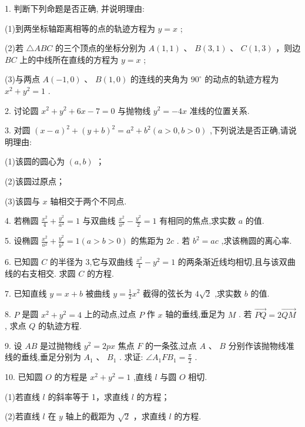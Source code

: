 \documentclass[10pt]{article}
\begin{document}
1. 判断下列命题是否正确, 并说明理由:

(1)到两坐标轴距离相等的点的轨迹方程为 \(y = x\) ;

(2)若 \(\bigtriangleup  {ABC}\) 的三个顶点的坐标分别为 \(A\left( {1,1}\right)\) 、 \(B\left( {3,1}\right)\) 、 \(C\left( {1,3}\right)\) ，则边 \({BC}\) 上的中线所在直线的方程为 \(y = x\) ;

(3)与两点 \(A\left( {-1,0}\right)\) 、 \(B\left( {1,0}\right)\) 的连线的夹角为 \({90}^{ \circ  }\) 的动点的轨迹方程为 \({x}^{2} + {y}^{2} = 1\) .

2. 讨论圆 \({x}^{2} + {y}^{2} + {6x} - 7 = 0\) 与抛物线 \({y}^{2} =  - {4x}\) 准线的位置关系.

3. 对圆 \({\left( x - a\right) }^{2} + {\left( y + b\right) }^{2} = {a}^{2} + {b}^{2}\left( {a > 0,b > 0}\right)\) ,下列说法是否正确,请说明理由:

(1)该圆的圆心为 \(\left( {a,b}\right)\) ；

(2)该圆过原点；

(3)该圆与 \(x\) 轴相交于两个不同点.

4. 若椭圆 \(\frac{{x}^{2}}{4} + \frac{{y}^{2}}{{a}^{2}} = 1\) 与双曲线 \(\frac{{x}^{2}}{{a}^{2}} - \frac{{y}^{2}}{2} = 1\) 有相同的焦点,求实数 \(a\) 的值.

5. 设椭圆 \(\frac{{x}^{2}}{{a}^{2}} + \frac{{y}^{2}}{{b}^{2}} = 1\left( {a > b > 0}\right)\) 的焦距为 \({2c}\) . 若 \({b}^{2} = {ac}\) ,求该椭圆的离心率.

6. 已知圆 \(C\) 的半径为 3,它与双曲线 \(\frac{{x}^{2}}{4} - {y}^{2} = 1\) 的两条渐近线均相切,且与该双曲线的右支相交. 求圆 \(C\) 的方程.

7. 已知直线 \(y = x + b\) 被曲线 \(y = \frac{1}{2}{x}^{2}\) 截得的弦长为 \(4\sqrt{2}\) ,求实数 \(b\) 的值.

8. \(P\) 是圆 \({x}^{2} + {y}^{2} = 4\) 上的动点,过点 \(P\) 作 \(x\) 轴的垂线,垂足为 \(M\) . 若 \(\overrightarrow{PQ} = 2\overrightarrow{QM}\) , 求点 \(Q\) 的轨迹方程.

9. 设 \({AB}\) 是过抛物线 \({y}^{2} = {2px}\) 焦点 \(F\) 的一条弦,过点 \(A\text{ 、 }B\) 分别作该抛物线准线的垂线,垂足分别为 \({A}_{1}\text{ 、 }{B}_{1}\) . 求证: \(\angle {A}_{1}F{B}_{1} = \frac{\pi }{2}\) .

10. 已知圆 \(O\) 的方程是 \({x}^{2} + {y}^{2} = 1\) ,直线 \(l\) 与圆 \(O\) 相切.

(1)若直线 \(l\) 的斜率等于 1，求直线 \(l\) 的方程；

(2)若直线 \(l\) 在 \(y\) 轴上的截距为 \(\sqrt{2}\) ，求直线 \(l\) 的方程.
\end{document}
